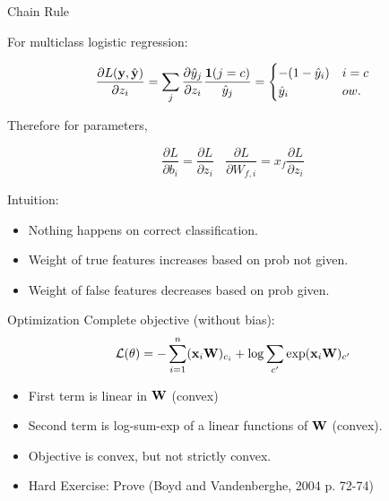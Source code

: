 \documentclass{beamer}
\begin{document}
\begin{frame}{Chain Rule}
  
  For multiclass logistic regression:
  
  \[ \frac{\partial L(\mathbf{y}, \hat{\mathbf{y}})}{\partial z_i} = \sum_{j} \frac{\partial \hat{y}_j }{\partial z_i}  \frac{\mathbf{1}(j = c)} {\hat{y}_j} =     \begin{cases}
      -(1 - \hat{y}_i) & i = c\\
      \hat{y}_i & ow. \\
    \end{cases} \] 

  Therefore for parameters, 

  \[\frac{\partial L}{\partial b_{i}} = 
    \frac{\partial L}{\partial z_{i}} \ \ \ \ \frac{\partial L}{\partial W_{f, i}} = 
     x_f \frac{\partial L}{\partial z_{i}}\]

   \pause
   Intuition:
   \begin{itemize}
   \item Nothing happens on correct classification.
   \item Weight of true features increases based on prob not given.
   \item Weight of false features decreases based on prob given.
   \end{itemize}
\end{frame}




\begin{frame}{Optimization}
  Complete objective (without bias):
  \[ \mathcal{L}(\theta) =  - \sum_{i=1}^n (\mathbf{x}_i \mathbf{W} )_{c_i}  + \log \sum_{c'} \exp  (\mathbf{x}_i \mathbf{W}  )_{c'} \] 
  \begin{itemize}
  \item First term is linear in $\mathbf{W}$ (convex)
  \item Second term is log-sum-exp of a linear functions of $\mathbf{W}$ (convex).
  \item Objective is convex, but not strictly convex.
  \item Hard Exercise: Prove (Boyd and  Vandenberghe, 2004 p. 72-74)
  \end{itemize}
\end{frame}
\end{document}
